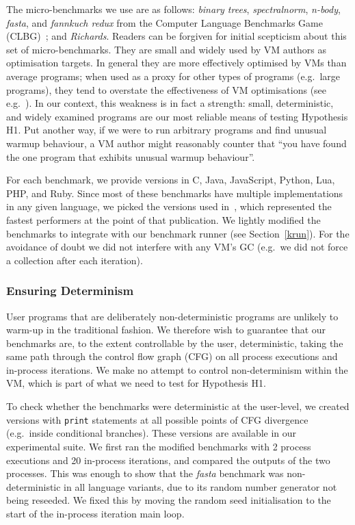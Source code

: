 \documentclass[acmlarge]{acmart}\settopmatter{printfolios=true}
\newcommand{\hypone}{H1\xspace}
\newcommand{\binarytrees}{\emph{binary trees}\xspace}
\newcommand{\richards}{\emph{Richards}\xspace}
\newcommand{\spectralnorm}{\emph{spectralnorm}\xspace}
\newcommand{\nbody}{\emph{n-body}\xspace}
\newcommand{\fasta}{\emph{fasta}\xspace}
\newcommand{\fannkuch}{\emph{fannkuch redux}\xspace}
\begin{document}
The micro-benchmarks we use are as follows: \binarytrees, \spectralnorm, \nbody,
\fasta, and \fannkuch from the Computer Language Benchmarks Game (CLBG)~\cite{clbg}; and
\richards. Readers can be forgiven for initial scepticism about this set of micro-benchmarks.
They are small and widely
used by VM authors as optimisation targets. In general they are more effectively
optimised by VMs than average programs; when used as a proxy for other types
of programs (e.g.~large programs), they tend to overstate the effectiveness of
VM optimisations (see e.g.~\cite{ratanaworabhan09jsmeter}). In our context, this weakness is in fact a strength:
small, deterministic, and widely examined programs are our most
reliable means of testing Hypothesis \hypone. Put another way, if we were to run arbitrary programs
and find unusual warmup behaviour, a VM author might reasonably counter that
``you have found the one program that exhibits unusual warmup behaviour''.

For each benchmark, we provide versions in C, Java, JavaScript, Python, Lua, PHP,
and Ruby. Since most of these
benchmarks have multiple implementations in any given language, we picked
the versions used in~\cite{bolz14impact}, which represented the fastest
performers at the point of that publication. We lightly modified
the benchmarks to integrate with our benchmark runner (see Section~\ref{krun}).
For the avoidance of doubt we did not interfere with any VM's GC (e.g.~we did not
force a collection after each iteration).


\subsubsection{Ensuring Determinism}

User programs that are deliberately non-deterministic programs are unlikely to
warm-up in the traditional fashion.
We therefore wish to guarantee that our benchmarks are,
to the extent controllable by the user, deterministic, taking
the same path through the control flow graph (CFG)
on all process executions and in-process iterations. We make no attempt to
control non-determinism within the VM, which is part of what we need to test for
Hypothesis \hypone.

To check whether the benchmarks were deterministic at the user-level, we created
versions with \texttt{print} statements at all possible points of CFG
divergence (e.g.~inside conditional branches).
These versions are available in our experimental suite. We first ran the modified
benchmarks with 2 process executions and 20 in-process iterations,
and compared the outputs of the two processes. This was enough to show that the
\fasta benchmark was non-deterministic
in all language variants, due to its random number generator not being reseeded. We
fixed this by moving the random seed initialisation to the start
of the in-process iteration main loop.
\end{document}
